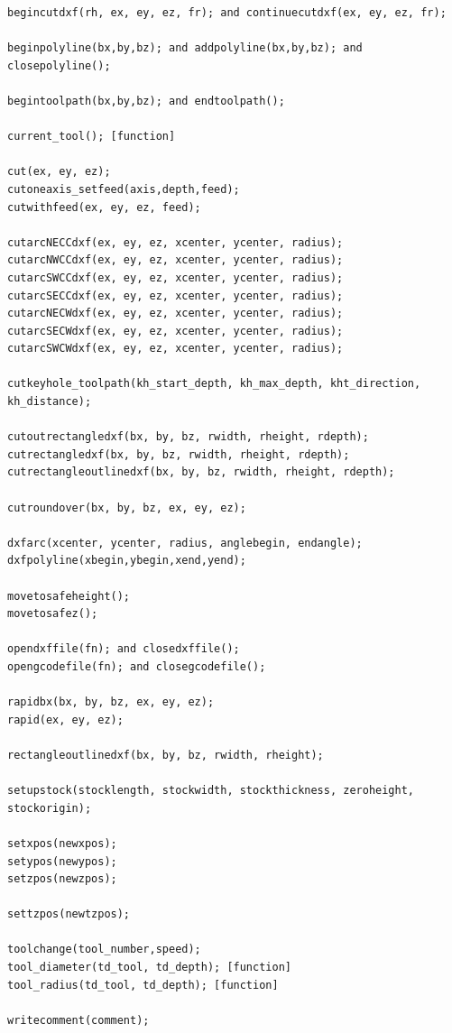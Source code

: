 \documentclass{ltxdoc}
\begin{document}
\begin{verbatim}
begincutdxf(rh, ex, ey, ez, fr); and continuecutdxf(ex, ey, ez, fr);

beginpolyline(bx,by,bz); and addpolyline(bx,by,bz); and closepolyline();

begintoolpath(bx,by,bz); and endtoolpath();

current_tool(); [function]

cut(ex, ey, ez);
cutoneaxis_setfeed(axis,depth,feed);
cutwithfeed(ex, ey, ez, feed);

cutarcNECCdxf(ex, ey, ez, xcenter, ycenter, radius);
cutarcNWCCdxf(ex, ey, ez, xcenter, ycenter, radius);
cutarcSWCCdxf(ex, ey, ez, xcenter, ycenter, radius);
cutarcSECCdxf(ex, ey, ez, xcenter, ycenter, radius);
cutarcNECWdxf(ex, ey, ez, xcenter, ycenter, radius);
cutarcSECWdxf(ex, ey, ez, xcenter, ycenter, radius);
cutarcSWCWdxf(ex, ey, ez, xcenter, ycenter, radius);

cutkeyhole_toolpath(kh_start_depth, kh_max_depth, kht_direction, kh_distance);

cutoutrectangledxf(bx, by, bz, rwidth, rheight, rdepth);
cutrectangledxf(bx, by, bz, rwidth, rheight, rdepth);
cutrectangleoutlinedxf(bx, by, bz, rwidth, rheight, rdepth);

cutroundover(bx, by, bz, ex, ey, ez);

dxfarc(xcenter, ycenter, radius, anglebegin, endangle);
dxfpolyline(xbegin,ybegin,xend,yend);

movetosafeheight();
movetosafez();

opendxffile(fn); and closedxffile();
opengcodefile(fn); and closegcodefile();

rapidbx(bx, by, bz, ex, ey, ez);
rapid(ex, ey, ez);

rectangleoutlinedxf(bx, by, bz, rwidth, rheight);

setupstock(stocklength, stockwidth, stockthickness, zeroheight, stockorigin);

setxpos(newxpos);
setypos(newypos);
setzpos(newzpos);

settzpos(newtzpos);

toolchange(tool_number,speed);
tool_diameter(td_tool, td_depth); [function]
tool_radius(td_tool, td_depth); [function]

writecomment(comment);
\end{verbatim}
\end{document}
